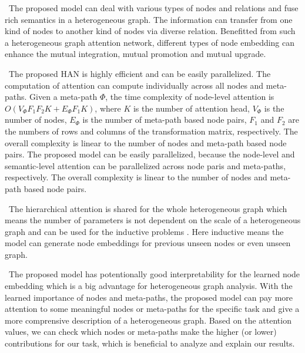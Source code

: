 \textbullet\ The proposed model can deal with various types of nodes and relations and fuse rich semantics in a heterogeneous graph. The information can transfer from one kind of nodes to another kind of nodes via diverse relation.  Benefitted from such a heterogeneous graph attention network, different types of node embedding can enhance the mutual integration, mutual promotion and mutual upgrade. 


\textbullet\
	The proposed HAN is highly efficient and can be easily parallelized.
The computation of attention can compute individually across all nodes and meta-paths.
	Given a meta-path $\Phi$, the time complexity of 
	node-level attention is $O(V_{\Phi} F_1F_2 K+ E_{\Phi}F_1K)$, 
where $K$ is the number of attention head,
$V_{\Phi}$ is the number of nodes,  
	$E_{\Phi}$ is the number of meta-path based node pairs, 
	$F_1$ and $F_2$ are the numbers of rows and columns of the transformation matrix, respectively.
	The overall complexity is linear to the number of nodes and 
	meta-path based node pairs. The proposed model can be easily parallelized, because the node-level and semantic-level attention can be parallelized across node paris and meta-paths, respectively.
	The overall complexity is linear to the number of nodes and meta-path based node pairs.
	
\textbullet\
	The hierarchical attention is shared for the whole heterogeneous graph 
	which means the number of parameters is not 
	dependent on the scale of a heterogeneous graph and can be used for the inductive problems \cite{graphsage}. 
	Here inductive means the model  can generate node embeddings for previous unseen nodes or even unseen graph. 
	
\textbullet\
	The proposed model has potentionally good interpretability for the learned node embedding which is a big advantage for heterogeneous graph analysis.
With the learned importance of nodes and meta-paths, 
	the proposed model can pay more attention to some meaningful nodes or meta-paths for the specific task and give a more comprensive description of a heterogeneous graph. Based on the attention values, we can check which nodes or meta-paths make the higher (or lower) contributions for our task, which is beneficial to analyze and explain our results.


	




	











